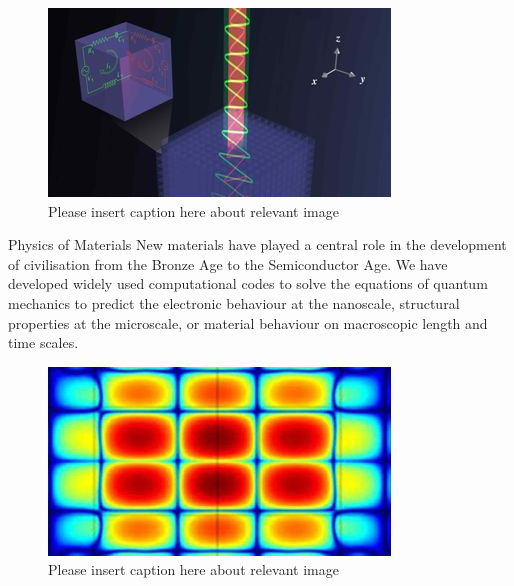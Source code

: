 \documentclass[xcolor={table}]{beamer}
\begin{document}
\begin{frame}[fragile=singleslide,t]
\begin{columns}[onlytextwidth,T]
\begin{column}{.47\textwidth}
\begin{figure}
    \includegraphics[width=1\columnwidth, height=0.2\textheight]{correlated.jpg}
    \caption{\footnotesize Please insert caption here about relevant image}
\end{figure}

\begin{block}{Physics of Materials}
New materials have played a central role in the development of civilisation from
the Bronze Age to the Semiconductor Age. We have developed widely used
computational codes to solve the equations of quantum mechanics to predict the
electronic behaviour at the nanoscale, structural properties at the microscale,
or material behaviour on macroscopic length and time scales.
\end{block}

\begin{figure}
    \includegraphics[width=\columnwidth, height=0.15\textheight]{simulation_materials.jpg}
    \caption{\footnotesize Please insert caption here about relevant image}
\end{figure}

\end{column}
\end{columns}

\end{frame}
\end{document}
